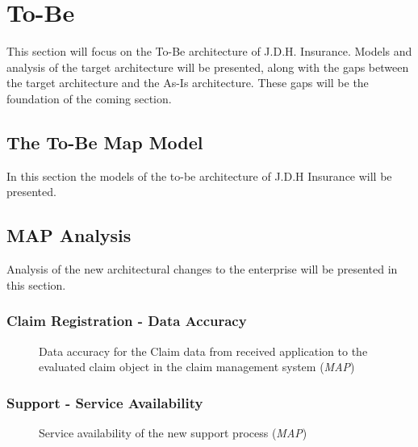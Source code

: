 \section{To-Be}
\label{sec:to_be}
This section will focus on the To-Be architecture of J.D.H. Insurance. Models and analysis of the target architecture will be presented, along with the gaps between the target architecture and the As-Is architecture. These gaps will be the foundation of the coming section.
%
\subsection{The To-Be Map Model}
\label{sec:models_to_be}
In this section the models of the to-be architecture of J.D.H Insurance will be presented.
%
\subsection{MAP Analysis}
\label{sec:map_analysis_to_be}
Analysis of the new architectural changes to the enterprise will be presented in this section.
\subsubsection{Claim Registration - Data Accuracy}
\label{sec:claim_analysis_to_be}
	\begin{center}
		\begin{figure}[H]
			\centering
			\setlength\fboxsep{7pt}
			\setlength\fboxrule{0.5pt}
			\caption{Data accuracy for the Claim data from received application to the evaluated claim object in the claim management system (\emph{MAP})}
			\label{fig:map_claim_data_to_be}
		\end{figure}
	\end{center}

%
\subsubsection{Support - Service Availability}
\label{sec:support_analysis_to_be}
\begin{center}
	\begin{figure}[H]
		\centering
		\setlength\fboxsep{7pt}
		\setlength\fboxrule{0.5pt}
		\caption{Service availability of the new support process (\emph{MAP})}
		\label{fig:map_support_combined_availability_to_be}
	\end{figure}
\end{center}

